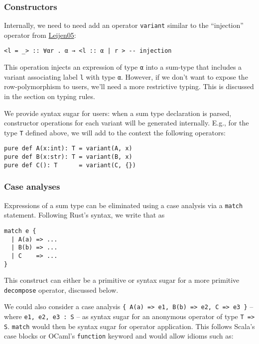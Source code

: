 \documentclass[11pt]{article}
\begin{document}
\subsubsection{Constructors}
\label{sec:org0157e94}

Internally, we need to need add an operator \texttt{variant} similar to the ``injection''
operator from \href{https://www.microsoft.com/en-us/research/publication/extensible-records-with-scoped-labels/}{Leijen05}:

\begin{verbatim}
<l = _> :: ∀αr . α → <l :: α | r > -- injection
\end{verbatim}


This operation injects an expression of type \texttt{α} into a sum-type that includes a
variant associating label \texttt{l} with type \texttt{α}.  However, if we don't want to
expose the row-polymorphism to users, we'll need a more restrictive typing. This
is discussed in the section on typing rules.

We provide syntax sugar for users: when a sum type declaration is parsed,
constructor operations for each variant will be generated internally. E.g., for
the type \texttt{T} defined above, we will add to the context the following operators:

\begin{verbatim}
pure def A(x:int): T = variant(A, x)
pure def B(x:str): T = variant(B, x)
pure def C(): T      = variant(C, {})
\end{verbatim}

\subsubsection{Case analyses}
\label{sec:org28b79fe}
Expressions of a sum type can be eliminated using a case analysis via
a \texttt{match} statement. Following Rust's syntax, we write that as

\begin{verbatim}
match e {
  | A(a) => ...
  | B(b) => ...
  | C    => ...
}
\end{verbatim}

This construct can either be a primitive or syntax sugar for a more
primitive \texttt{decompose} operator, discussed below.

We could also consider a case analysis \texttt{\{ A(a) => e1, B(b) => e2, C => e3 \}} --
where \texttt{e1, e2, e3 : S} -- as syntax sugar for an anonymous operator of type \texttt{T
=> S}. \texttt{match} would then be syntax sugar for operator application. This follows
Scala's case blocks or OCaml's \texttt{function} keyword and would allow idioms such
as:
\end{document}

